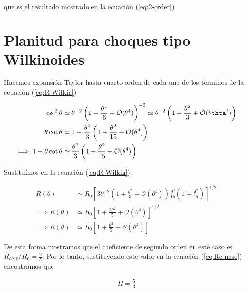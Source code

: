 que es el resultado mostrado en la ecuación (\ref{eq:2-order})

\section[Planitud Wilkinoides]{Planitud para choques tipo Wilkinoides}
\label{sec:Rc-Wilkin}
Hacemos expansión Taylor hasta cuarto orden de cada uno de los términos de la ecuación (\ref{eq:R-Wilkin})

\begin{align}
  \csc^2\theta &\simeq \theta^{-2}\left(1 - \frac{\theta^2}{6} + \mathcal{O}(\theta^4)\right)^{-2} \simeq
                 \theta^{-2}\left(1 + \frac{\theta^2}{3} + \mathcal{O}(\thta^4)\right) \\
  \theta\cot\theta &\simeq 1 - \frac{\theta^2}{3}\left(1 + \frac{\theta^2}{15} + \mathcal{O}(\theta^4)\right) \\
  \implies 1 -\theta\cot\theta &\simeq \frac{\theta^2}{3}\left(1 + \frac{\theta^2}{15} + \mathcal{O}(\theta^4)\right)
\end{align}

Sustituímos en la ecuación (\ref{eq:R-Wilkin}):

\begin{align}
  R(\theta) &\simeq R_0\left[3\theta^{-2}\left(1 + \frac{\theta^2}{3}+\mathcal{O}(\theta^4)\right)\frac{\theta^2}{15}
  \left(1 + \frac{\theta^2}{15}\right) \right]^{1/2} \\
  \implies R(\theta) &\simeq R_0\left[1 + \frac{2\theta^2}{5} + \mathcal{O}(\theta^4)\right]^{1/2} \\
  \implies R(\theta) &\simeq R_0\left[1 + \frac{\theta^2}{5} + \mathcal{O}(\theta^4)\right]
\end{align}

De esta forma mostramos que el coeficiente de segundo orden en este caso es $R_{\theta \theta, 0}/R_0 = \frac{2}{5}$. Por lo tanto,
sustituyendo este valor en la ecuación (\ref{eq:Rc-nose}) encontramos que

\begin{align}
  \Pi = \frac{5}{3}
\end{align}


